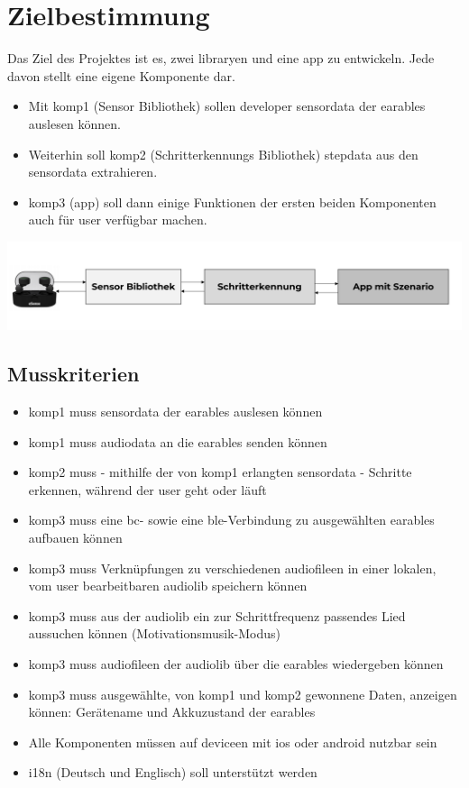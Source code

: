 \documentclass[../pflichtenheft.tex]{subfiles}
\begin{document}
\clearpage

\section{Zielbestimmung}
	Das Ziel des Projektes ist es, zwei \Gls{library}en und eine \Gls{app} zu entwickeln. Jede davon stellt eine eigene Komponente dar.
	\begin{itemize}
		\item Mit \Gls{komp1} (Sensor Bibliothek) sollen \Gls{developer} \Gls{sensordata} der \Gls{earable}s auslesen können.
		\item Weiterhin soll \Gls{komp2} (Schritterkennungs Bibliothek) \Gls{stepdata} aus den \Gls{sensordata} extrahieren.
		\item \Gls{komp3} (\Gls{app}) soll dann einige Funktionen der ersten beiden Komponenten auch für \gls{user} verfügbar machen.
	\end{itemize}
	\includegraphics[page=1,width=400pt,keepaspectratio]{../graphics/Praeambel/YHB_Project_Pic.png}
	\subsection{Musskriterien}
		\begin{itemize}
			\item \Gls{komp1} muss \Gls{sensordata} der \Gls{earable}s auslesen können
			\item \Gls{komp1} muss \Gls{audiodata} an die \Gls{earable}s senden können
			\item \Gls{komp2} muss - mithilfe der von \Gls{komp1} erlangten \Gls{sensordata} - Schritte erkennen, während der \Gls{user} geht oder läuft
			\item \Gls{komp3} muss eine \Gls{bc}- sowie eine \Gls{ble}-Verbindung zu ausgewählten \Gls{earable}s aufbauen können
			\item \Gls{komp3} muss Verknüpfungen zu verschiedenen \gls{audiofile}en in einer lokalen, vom \Gls{user} bearbeitbaren \Gls{audiolib} speichern können
			\item \Gls{komp3} muss aus der \Gls{audiolib} ein zur Schrittfrequenz passendes Lied aussuchen können (Motivationsmusik-Modus)
			\item \Gls{komp3} muss \gls{audiofile}en der \Gls{audiolib} über die \Gls{earable}s wiedergeben können
			\item \Gls{komp3} muss ausgewählte, von \Gls{komp1} und \Gls{komp2} gewonnene Daten, anzeigen können: Gerätename und Akkuzustand der \Gls{earable}s
			\item Alle Komponenten müssen auf \Gls{device}en mit \gls{ios} oder \Gls{android} nutzbar sein
			\item \Gls{i18n} (Deutsch und Englisch) soll unterstützt werden
		\end{itemize} 
\end{document}
